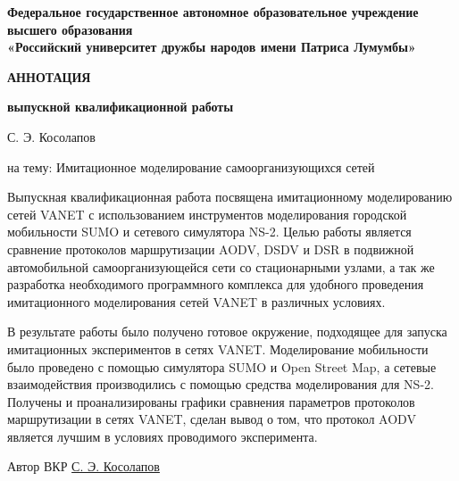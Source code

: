 \thispagestyle{empty}

  \begin{center}

    \textbf{Федеральное государственное автономное образовательное учреждение \\
высшего образования} \\
\textbf{«Российский университет дружбы народов имени Патриса Лумумбы»}

\hfill

\textbf{АННОТАЦИЯ}

\textbf{выпускной квалификационной работы }

\vspace{1cm}

С. Э. Косолапов

\vspace{1cm}
на тему: Имитационное моделирование самоорганизующихся сетей
\end{center}

\vspace{1cm}


Выпускная квалификационная работа посвящена имитационному
моделированию сетей VANET с использованием инструментов моделирования городской мобильности SUMO и сетевого симулятора NS-2. Целью работы является сравнение протоколов маршрутизации AODV, DSDV и DSR в подвижной автомобильной самоорганизующейся сети со стационарными узлами, а так же разработка необходимого программного комплекса для удобного проведения имитационного моделирования сетей VANET в различных условиях.

В результате работы было получено готовое окружение, подходящее для запуска имитационных экспериментов в сетях VANET. Моделирование мобильности было проведено с помощью симулятора SUMO и Open Street Map, а сетевые взаимодействия производились с помощью средства моделирования для NS-2. Получены и проанализированы графики сравнения параметров протоколов маршрутизации в сетях VANET, сделан вывод о том, что протокол AODV является лучшим в условиях проводимого эксперимента.

\hfill

Автор ВКР \hspace{1cm} \underline{\hspace{3cm}} \hspace{1cm} \underline{С. Э. Косолапов }
